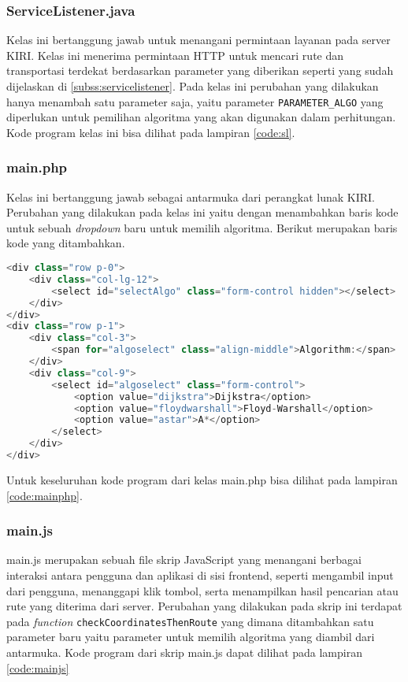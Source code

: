 \subsubsection{ServiceListener.java}
Kelas ini bertanggung jawab untuk menangani permintaan layanan pada server KIRI. Kelas ini menerima permintaan HTTP untuk mencari rute dan transportasi terdekat berdasarkan parameter yang diberikan seperti yang sudah dijelaskan di \ref{subss:servicelistener}. Pada kelas ini perubahan yang dilakukan hanya menambah satu parameter saja, yaitu parameter \texttt{PARAMETER\_ALGO} yang diperlukan untuk pemilihan algoritma yang akan digunakan dalam perhitungan. Kode program kelas ini bisa dilihat pada lampiran \ref{code:sl}.


\subsubsection{main.php}
Kelas ini bertanggung jawab sebagai antarmuka dari perangkat lunak KIRI. Perubahan yang dilakukan pada kelas ini yaitu dengan menambahkan baris kode untuk sebuah \textit{dropdown} baru untuk memilih algoritma. Berikut merupakan baris kode yang ditambahkan.

\begin{lstlisting}[language=Java, caption=main.php, basicstyle=\small\ttfamily]
<div class="row p-0">
	<div class="col-lg-12">
		<select id="selectAlgo" class="form-control hidden"></select>
	</div>
</div>
<div class="row p-1">
	<div class="col-3">
		<span for="algoselect" class="align-middle">Algorithm:</span>
	</div>
	<div class="col-9">
		<select id="algoselect" class="form-control">
			<option value="dijkstra">Dijkstra</option>
			<option value="floydwarshall">Floyd-Warshall</option>
			<option value="astar">A*</option>
		</select>
	</div>
</div>
\end{lstlisting}
\noindent
Untuk keseluruhan kode program dari kelas main.php bisa dilihat pada lampiran \ref{code:mainphp}.
\subsubsection{main.js}
main.js merupakan sebuah file skrip JavaScript yang menangani berbagai interaksi antara pengguna dan aplikasi di sisi frontend, seperti mengambil input dari pengguna, menanggapi klik tombol, serta menampilkan hasil pencarian atau rute yang diterima dari server. Perubahan yang dilakukan pada skrip ini terdapat pada \textit{function} \texttt{checkCoordinatesThenRoute} yang dimana ditambahkan satu parameter baru yaitu parameter untuk memilih algoritma yang diambil dari antarmuka. Kode program dari skrip main.js dapat dilihat pada lampiran \ref{code:mainjs}

